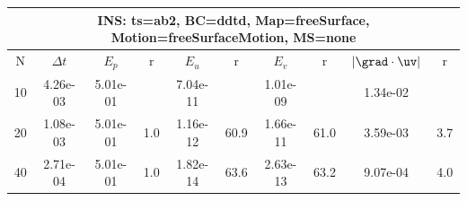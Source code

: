 
\begin{tabular}{|c|c|c|c|c|c|c|c|c|c|} \hline
 \multicolumn{10}{|c|}{INS: ts=ab2, BC=ddtd, Map=freeSurface, Motion=freeSurfaceMotion, MS=none } \\ \hline 
     N  &   $\Delta t$ & $E_p$   &  r  &   $E_u$   &   r    &   $E_v$   & r   &  $|\grad\cdot\uv|$  & r   \\ \hline 
  10   &  4.26e-03  &   5.01e-01  &        &   7.04e-11  &        &   1.01e-09  &        &   1.34e-02  &        \\ 
  20   &  1.08e-03  &   5.01e-01  & 1.0  &   1.16e-12  & 60.9  &   1.66e-11  & 61.0  &   3.59e-03  & 3.7  \\ 
  40   &  2.71e-04  &   5.01e-01  & 1.0  &   1.82e-14  & 63.6  &   2.63e-13  & 63.2  &   9.07e-04  & 4.0  \\ 
 \hline 
\end{tabular}
